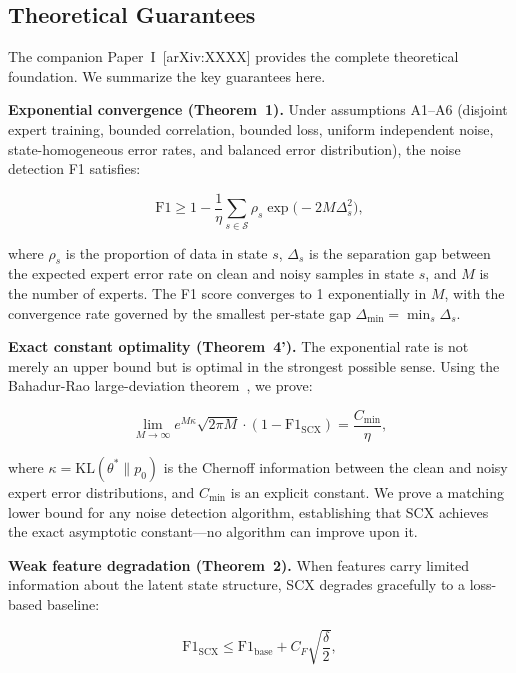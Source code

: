 \documentclass[12pt,a4paper]{article}
\begin{document}
\subsection{Theoretical Guarantees}

The companion Paper~I~[arXiv:XXXX] provides the complete theoretical foundation. We summarize the key guarantees here.

\textbf{Exponential convergence (Theorem~1).} Under assumptions A1--A6 (disjoint expert training, bounded correlation, bounded loss, uniform independent noise, state-homogeneous error rates, and balanced error distribution), the noise detection F1 satisfies:

\begin{equation}
\mathrm{F1} \geq 1 - \frac{1}{\eta} \sum_{s \in \mathcal{S}} \rho_s \exp\!\bigl(-2M\Delta_s^2\bigr),
\label{eq:thm1}
\end{equation}

where $\rho_s$ is the proportion of data in state $s$, $\Delta_s$ is the separation gap between the expected expert error rate on clean and noisy samples in state $s$, and $M$ is the number of experts. The F1 score converges to 1 exponentially in $M$, with the convergence rate governed by the smallest per-state gap $\Delta_{\min} = \min_s \Delta_s$.

\textbf{Exact constant optimality (Theorem~4').} The exponential rate is not merely an upper bound but is optimal in the strongest possible sense. Using the Bahadur-Rao large-deviation theorem~\cite{bahadur1960deviations}, we prove:

\begin{equation}
\lim_{M\to\infty} e^{M\kappa} \sqrt{2\pi M} \cdot (1 - \mathrm{F1}_{\mathrm{SCX}}) = \frac{C_{\min}}{\eta},
\label{eq:thm4prime}
\end{equation}

where $\kappa = \mathrm{KL}(\theta^*\|p_0)$ is the Chernoff information between the clean and noisy expert error distributions, and $C_{\min}$ is an explicit constant. We prove a matching lower bound for any noise detection algorithm, establishing that SCX achieves the exact asymptotic constant---no algorithm can improve upon it.

\textbf{Weak feature degradation (Theorem~2).} When features carry limited information about the latent state structure, SCX degrades gracefully to a loss-based baseline:

\begin{equation}
\mathrm{F1}_{\mathrm{SCX}} \leq \mathrm{F1}_{\mathrm{base}} + C_F \sqrt{\frac{\delta}{2}},
\label{eq:thm2}
\end{equation}
\end{document}
